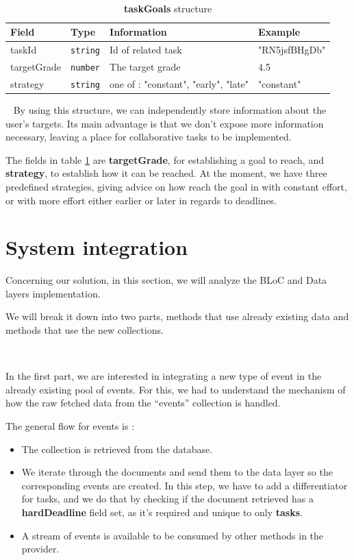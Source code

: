 ~

\begin{table}[th]\small\linespread{1}
\caption{\textbf{taskGoals} structure}
\label{4:tab:goalstruct}
\begin{tabular}{| l | l | p{5.6cm} | p{3.6cm} |}
\hline
\textbf{Field} & \textbf{Type} & \textbf{Information} & \textbf{Example} \\
\hline
taskId & \texttt{string} & Id of related task & "RN5jsfBHgDb"
\\
\hline
targetGrade &\texttt{number} & The target grade & 4.5
\\
\hline
strategy &\texttt{string} & one of : "constant", "early", "late" & "constant" 
\\
\hline
\end{tabular}
\end{table}

~
By using this structure, we can independently store information about the user’s targets. Its main advantage is that we don’t expose more information necessary, leaving a place for collaborative tasks to be implemented.

The fields in table \ref{4:tab:goalstruct} are \textbf{targetGrade}, for establishing a goal to reach, and \textbf{strategy}, to establish how it can be reached. At the moment, we have three predefined strategies, giving advice on how reach the goal in with constant effort, or with more effort either earlier or later in regards to deadlines. 


\section{System integration} \label{4:system}

Concerning our solution, in this section, we will analyze the BLoC and Data layers implementation. 

We will break it down into two parts, methods that use already existing data and methods that use the new collections.

~

In the first part, we are interested in integrating a new type of event in the already existing pool of events. For this, we had to understand the mechanism of how the raw fetched data from the “events” collection is handled.

The general flow for events is :
\begin{itemize}
            \setlength{\topsep}{0.5pt}
            \setlength{\itemsep}{0.5pt}
            \setlength{\parsep}{0.5pt}
            \item The collection is retrieved from the database.
            \item We iterate through the documents and send them to the data layer so the corresponding events are created. In this step, we have to add a differentiator for tasks, and we do that by checking if the document retrieved has a \textbf{hardDeadline} field set, as it’s required and unique to only \textbf{tasks}.
            \item A stream of events is available to be consumed by other methods in the provider. 
\end{itemize}

